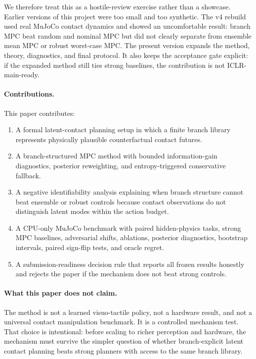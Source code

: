 \documentclass{article}
\begin{document}
We therefore treat this as a hostile-review exercise rather than a showcase.  Earlier versions of this project were too small and too synthetic.  The v4 rebuild used real MuJoCo contact dynamics and showed an uncomfortable result: branch MPC beat random and nominal MPC but did not clearly separate from ensemble mean MPC or robust worst-case MPC.  The present version expands the method, theory, diagnostics, and final protocol.  It also keeps the acceptance gate explicit: if the expanded method still ties strong baselines, the contribution is not ICLR-main-ready.

\paragraph{Contributions.}
This paper contributes:
\begin{enumerate}[leftmargin=1.4em]
  \item A formal latent-contact planning setup in which a finite branch library represents physically plausible counterfactual contact futures.
  \item A branch-structured MPC method with bounded information-gain diagnostics, posterior reweighting, and entropy-triggered conservative fallback.
  \item A negative identifiability analysis explaining when branch structure cannot beat ensemble or robust controls because contact observations do not distinguish latent modes within the action budget.
  \item A CPU-only MuJoCo benchmark with paired hidden-physics tasks, strong MPC baselines, adversarial shifts, ablations, posterior diagnostics, bootstrap intervals, paired sign-flip tests, and oracle regret.
  \item A submission-readiness decision rule that reports all frozen results honestly and rejects the paper if the mechanism does not beat strong controls.
\end{enumerate}

\paragraph{What this paper does not claim.}
The method is not a learned visuo-tactile policy, not a hardware result, and not a universal contact manipulation benchmark.  It is a controlled mechanism test.  That choice is intentional: before scaling to richer perception and hardware, the mechanism must survive the simpler question of whether branch-explicit latent contact planning beats strong planners with access to the same branch library.
\end{document}

